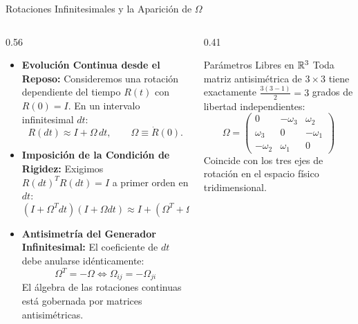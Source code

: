 \documentclass[10pt,aspectratio=169]{beamer}
\begin{document}
\begin{frame}{Rotaciones Infinitesimales y la Aparición de $\Omega$}
  \begin{columns}[c]
    \begin{column}{0.56\textwidth}
      \footnotesize
      \begin{itemize}\itemsep2pt
        \item \textbf{Evolución Continua desde el Reposo:}
        Consideremos una rotación dependiente del tiempo $R(t)$ con $R(0) = I$. En un intervalo infinitesimal $dt$:
        \[
        R(dt) \approx I + \Omega\, dt, \qquad \Omega \equiv \dot{R}(0).
        \]
        \item \textbf{Imposición de la Condición de Rigidez:}
        Exigimos $R(dt)^T R(dt) = I$ a primer orden en $dt$:
        \[
        (I + \Omega^T dt)(I + \Omega dt) \approx I + (\Omega^T + \Omega)dt + \mathcal{O}(dt^2) = I.
        \]
        \item \textbf{Antisimetría del Generador Infinitesimal:}
        El coeficiente de $dt$ debe anularse idénticamente:
        \[
        \boxed{\Omega^T = -\Omega \iff \Omega_{ij} = -\Omega_{ji}}
        \]
        El álgebra de las rotaciones continuas está gobernada por matrices antisimétricas.
      \end{itemize}
    \end{column}
    \begin{column}{0.41\textwidth}
      \footnotesize
      \begin{block}{Parámetros Libres en $\mathbb{R}^3$}
        \scriptsize
        Toda matriz antisimétrica de $3 \times 3$ tiene exactamente $\frac{3(3-1)}{2} = 3$ grados de libertad independientes:
        \[
        \Omega = \begin{pmatrix} 0 & -\omega_3 & \omega_2 \\ \omega_3 & 0 & -\omega_1 \\ -\omega_2 & \omega_1 & 0 \end{pmatrix}
        \]
        Coincide con los tres ejes de rotación en el espacio físico tridimensional.
      \end{block}
    \end{column}
  \end{columns}
\end{frame}
\end{document}
